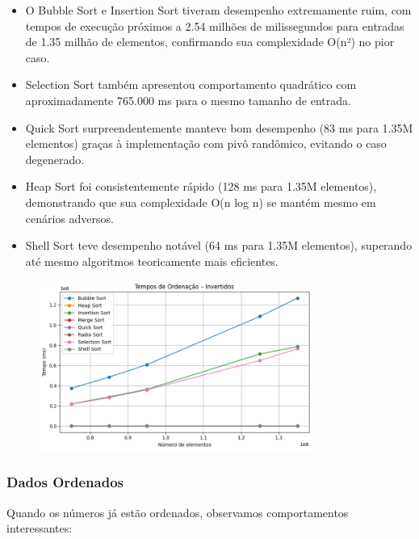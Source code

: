 \documentclass[a4paper, 12pt]{article}
\begin{document}
            \begin{itemize}
                \item O Bubble Sort e Insertion Sort tiveram desempenho extremamente ruim, com tempos de execução próximos a 2.54 milhões de milissegundos para entradas de 1.35 milhão de elementos, confirmando sua complexidade O(n²) no pior caso.
                \item Selection Sort também apresentou comportamento quadrático com aproximadamente 765.000 ms para o mesmo tamanho de entrada.
                \item Quick Sort surpreendentemente manteve bom desempenho (83 ms para 1.35M elementos) graças à implementação com pivô randômico, evitando o caso degenerado.
                \item Heap Sort foi consistentemente rápido (128 ms para 1.35M elementos), demonstrando que sua complexidade O(n log n) se mantém mesmo em cenários adversos.
                \item Shell Sort teve desempenho notável (64 ms para 1.35M elementos), superando até mesmo algoritmos teoricamente mais eficientes.
            \end{itemize}

            \begin{figure}[ht]
                \centering
                \includegraphics[width=0.8\textwidth]{images/invertidos.png}
            \end{figure}

        \subsubsection{Dados Ordenados}
            Quando os números já estão ordenados, observamos comportamentos interessantes:
\end{document}
